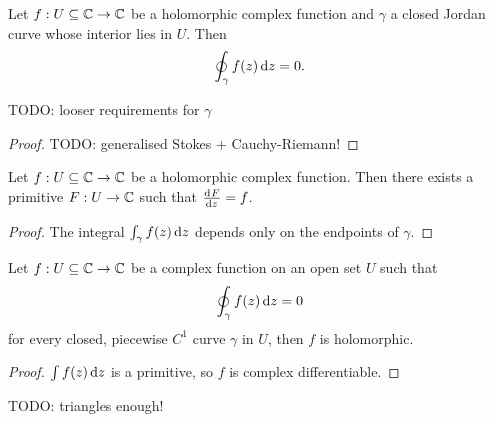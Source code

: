 \begin{theorem} \label{CauchyTheorem}
Let $f: U\subseteq \mathbb{C} \to \mathbb{C}$ be a holomorphic complex function and $\gamma$ a closed Jordan curve whose interior lies in $U$. Then
\[ \oint_\gamma f(z)\operatorname{d \!}{z} = 0. \]
\end{theorem}
TODO: looser requirements for $\gamma$
\begin{proof}
TODO: generalised Stokes + Cauchy-Riemann!
\end{proof}
\begin{corollary}
Let $f: U\subseteq \mathbb{C} \to \mathbb{C}$ be a holomorphic complex function. Then there exists a primitive $F: U\to \mathbb{C}$ such that $\od{F}{z} = f$.
\end{corollary}
\begin{proof}
The integral $\int_\gamma f(z)\operatorname{d \!}{z}$ depends only on the endpoints of $\gamma$.
\end{proof}

\begin{theorem}
Let $f: U\subseteq \mathbb{C} \to \mathbb{C}$ be a complex function on an open set $U$ such that
\[ \oint_\gamma f(z) \operatorname{d \!}{z} = 0 \]
for every closed, piecewise $C^1$ curve $\gamma$ in $U$, then $f$ is holomorphic.
\end{theorem}
\begin{proof}
$\int f(z)\operatorname{d \!}{z}$ is a primitive, so $f$ is complex differentiable.
\end{proof}
TODO: triangles enough!


